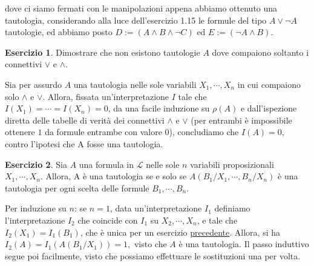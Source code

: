 \documentclass[a4paper]{article}
\theoremstyle{definition}
\theoremstyle{definition}
\theoremstyle{remark}
\theoremstyle{definition}
\newtheorem{exercise}{Esercizio}[section]
\begin{document}
dove ci siamo fermati con le manipolazioni appena abbiamo ottenuto una tautologia, considerando alla luce dell'esercizio 1.15 le formule del tipo $A\lor\lnot A$ tautologie, ed abbiamo posto $D:=\left( A\land B\land\lnot C \right) $ ed $E:=\left( \lnot A\land B \right) $.
\begin{exercise}\label{connettivi}
	 Dimostrare che non esistono tautologie $A$ dove compaiono soltanto i connettivi $\lor$ e $\land$.
\end{exercise}
Sia per assurdo $A$ una tautologia nelle sole variabili $X_1,\cdots,X_n$ in cui compaiono solo $\land$ e $\lor$.
Allora, fissata un'interpretazione $I$ tale che $I( X_1 )
=\cdots=I(X_n )=0$, da una facile induzione su $\rho(A)$ e dall'ispezione diretta delle tabelle di verità dei connettivi $\land$ e $\lor$ (per entrambi è impossibile ottenere $1$
da formule entrambe con valore $0$), concludiamo che $I( A ) =0$, contro l'ipotesi che A fosse una
tautologia.
\setcounter{exercise}{18}
\begin{exercise}
	Sia $A$ una formula in $\mathcal{L}$ nelle sole $n$ variabili proposizionali $X_1,\cdots,X_n $. Allora, A è una tautologia se e solo se $A\left( B_1\slash X_1,\cdots, B_n\slash X_n \right) $ è una
	tautologia per ogni scelta delle formule $B_1,\cdots,B_n$.
\end{exercise}
Per induzione su $n$: se $n=1$, data un'interpretazione $I_1$ definiamo l'interpretazione $I_2$ che coincide con $I_1$ su $X_2,\cdots,X_n$, e tale che
$I_2(X_1)=I_1(B_1)$, che è
unica per un esercizio \hyperref[unicità]{precedente}. Allora, si ha
$I_2(A)=I_1(A(B_1\slash X_1))=1,$ visto che $A$ è una tautologia.
Il passo induttivo segue poi facilmente, visto che possiamo effettuare le sostituzioni una per volta.
\end{document}
